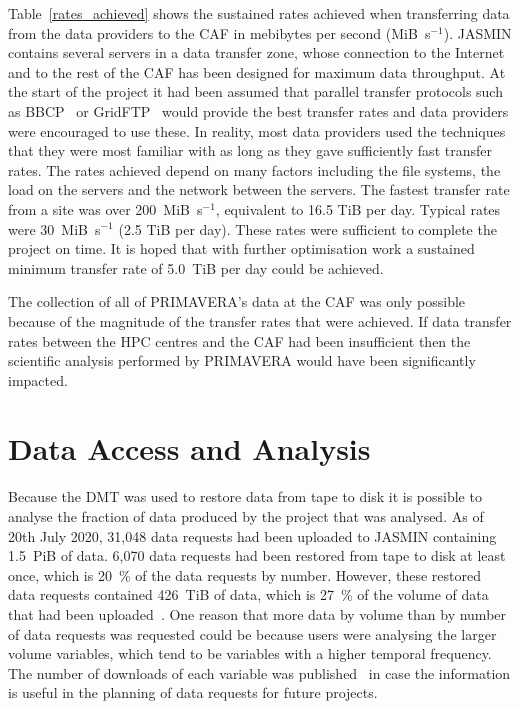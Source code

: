 \documentclass[gmd, manuscript]{copernicus}
\begin{document}
Table~\ref{rates_achieved} shows the sustained rates achieved when transferring data from the data providers to the CAF in mebibytes per second (MiB~s$^{-1}$). JASMIN contains several servers in a data transfer zone, whose connection to the Internet and to the rest of the CAF has been designed for maximum data throughput. At the start of the project it had been assumed that parallel transfer protocols such as BBCP~\citep{bbcp} or GridFTP~\citep{Foster}\citep{Globus} would provide the best transfer rates and data providers were encouraged to use these. In reality, most data providers used the techniques that they were most familiar with as long as they gave sufficiently fast transfer rates. The rates achieved depend on many factors including the file systems, the load on the servers and the network between the servers. The fastest transfer rate from a site was over 200~MiB~s$^{-1}$, equivalent to 16.5 TiB per day. Typical rates were 30~MiB~s$^{-1}$ (2.5 TiB per day). These rates were sufficient to complete the project on time. It is hoped that with further optimisation work a sustained minimum transfer rate of 5.0~TiB per day could be achieved.

The collection of all of PRIMAVERA's data at the CAF was only possible because of the magnitude of the transfer rates that were achieved. If data transfer rates between the HPC centres and the CAF had been insufficient then the scientific analysis performed by PRIMAVERA would have been significantly impacted.

\section{Data Access and Analysis}

Because the DMT was used to restore data from tape to disk it is possible to analyse the fraction of data produced by the project that was analysed. As of 20th July 2020, 31,048 data requests had been uploaded to JASMIN containing 1.5~PiB of data. 6,070 data requests had been restored from tape to disk at least once, which is 20~\% of the data requests by number. However, these restored data requests contained 426~TiB of data, which is 27~\% of the volume of data that had been uploaded~\citep{Seddon2020b}. One reason that more data by volume than by number of data requests was requested could be because users were analysing the larger volume variables, which tend to be variables with a higher temporal frequency. The number of downloads of each variable was published~\citep{Seddon2020c} in case the information is useful in the planning of data requests for future projects.
\end{document}
